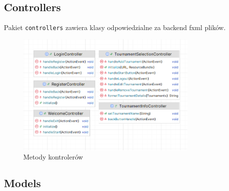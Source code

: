 \subsection{Controllers}
Pakiet \texttt{controllers} zawiera klasy odpowiedzialne za backend fxml plików. 

\begin{figure}[H]
    \centering
    \caption{Metody kontrolerów \label{fig4}}
    \includegraphics[width=0.8\textwidth]{figures/ControllersMethods.png}
\end{figure}








\subsection{Models}

